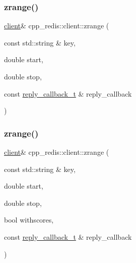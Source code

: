 \subsubsection{\texorpdfstring{zrange()}{zrange()}\hspace{0.1cm}{\footnotesize\ttfamily [4/9]}}
{\footnotesize\ttfamily \hyperlink{classcpp__redis_1_1client}{client}\& cpp\+\_\+redis\+::client\+::zrange (\begin{DoxyParamCaption}\item[{const std\+::string \&}]{key,  }\item[{double}]{start,  }\item[{double}]{stop,  }\item[{const \hyperlink{classcpp__redis_1_1client_a061a1140d36d2eaeda82b09a0bb3f9f2}{reply\+\_\+callback\+\_\+t} \&}]{reply\+\_\+callback }\end{DoxyParamCaption})}

\mbox{\label{classcpp__redis_1_1client_ab37fd922b733c5fa64f7a0dc4be22efe}} 
\subsubsection{\texorpdfstring{zrange()}{zrange()}\hspace{0.1cm}{\footnotesize\ttfamily [5/9]}}
{\footnotesize\ttfamily \hyperlink{classcpp__redis_1_1client}{client}\& cpp\+\_\+redis\+::client\+::zrange (\begin{DoxyParamCaption}\item[{const std\+::string \&}]{key,  }\item[{double}]{start,  }\item[{double}]{stop,  }\item[{bool}]{withscores,  }\item[{const \hyperlink{classcpp__redis_1_1client_a061a1140d36d2eaeda82b09a0bb3f9f2}{reply\+\_\+callback\+\_\+t} \&}]{reply\+\_\+callback }\end{DoxyParamCaption})}

\mbox{\label{classcpp__redis_1_1client_a0286a2953aeaec8c23d0e292fe2fccc2}} 
